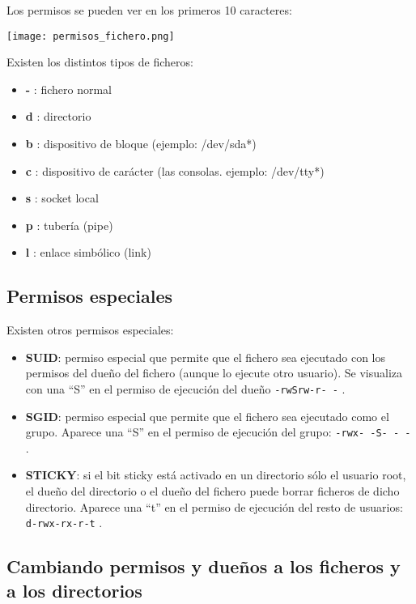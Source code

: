 Los permisos se pueden ver en los primeros 10 caracteres:

\begin{center}
  \texttt{[image: permisos\_fichero.png]}
\end{center}

Existen los distintos tipos de ficheros:
\begin{itemize}
    \item \textbf{-} : fichero normal
    \item \textbf{d} : directorio
    \item \textbf{b} : dispositivo de bloque (ejemplo: /dev/sda*)
    \item \textbf{c} : dispositivo de carácter (las consolas. ejemplo: /dev/tty*)
    \item \textbf{s} : socket local
    \item \textbf{p} : tubería (pipe)
    \item \textbf{l} : enlace simbólico (link)
\end{itemize}

\subsection{Permisos especiales}

Existen otros permisos especiales:
\begin{itemize}
    \item \textbf{SUID}: permiso especial que permite que el fichero sea ejecutado con los permisos del dueño del fichero (aunque lo ejecute otro usuario). Se visualiza con una “S” en el permiso de ejecución del dueño  \texttt{-rwSrw-r- -} .
    \item \textbf{SGID}: permiso especial que permite que el fichero sea ejecutado como el grupo. Aparece una “S” en el permiso de ejecución del grupo: \texttt{-rwx- -S- - -} .
    \item \textbf{STICKY}: si el bit sticky está activado en un directorio sólo el usuario root, el dueño del directorio o el dueño del fichero puede borrar ficheros de dicho directorio. Aparece una “t” en el permiso de ejecución del resto de usuarios:   \texttt{d-rwx-rx-r-t} .

\end{itemize}

\subsection{Cambiando permisos y dueños a los ficheros y a los directorios}

